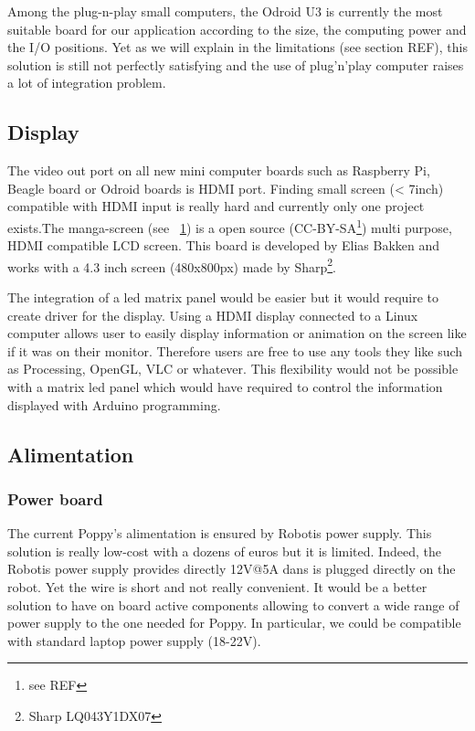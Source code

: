 Among the plug-n-play small computers, the Odroid U3 is currently the most suitable board for our application according to the size, the computing power and the I/O positions.
Yet as we will explain in the limitations (see section REF), this solution is still not perfectly satisfying and the use of plug'n'play computer raises a lot of integration problem.

\subsection{Display} %

The video out port on all new mini computer boards such as Raspberry Pi, Beagle board or Odroid boards is HDMI port. Finding small screen (< 7inch) compatible with HDMI input is really hard and currently only one project exists.The manga-screen (see \figurename~\ref{fig:manga-screen}) is a open source (CC-BY-SA\footnote{see REF}) multi purpose, HDMI compatible LCD screen. This board is developed by Elias Bakken and works with a 4.3 inch screen (480x800px) made by Sharp\footnote{Sharp LQ043Y1DX07}.

\begin{figure}[h]
\centering
    \hfil
    \caption{}
    \label{fig:manga-screen}
\end{figure}

The integration of a led matrix panel would be easier but it would require to create driver for the display.
Using a HDMI display connected to a Linux computer allows user to easily display information or animation on the screen like if it was on their monitor. Therefore users are free to use any tools they like such as Processing, OpenGL, VLC or whatever. This flexibility would not be possible with a matrix led panel which would have required to control the information displayed with Arduino programming.

\subsection{Alimentation} %
\label{ssub:alimentation}

\subsubsection{Power board} %
The current Poppy's alimentation is ensured by Robotis power supply. This solution is really low-cost with a dozens of euros but it is limited. Indeed, the Robotis power supply provides directly 12V@5A dans is plugged directly on the robot. Yet the wire is short and not really convenient. It would be a better solution to have on board active components allowing to convert a wide range of power supply to the one needed for Poppy. In particular, we could be compatible with standard laptop power supply (18-22V).

